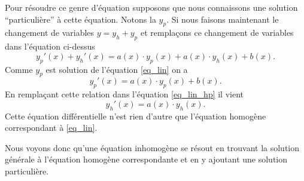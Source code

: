 \documentclass[a4paper,12pt]{book}
\renewcommand{\eqref}[1]{\ref{#1}}
\begin{document}
Pour résoudre ce genre d'équation supposons que nous connaissons une solution ``particulière'' à cette équation. Notons la
$y_p$. Si nous faisons maintenant le changement de variables $y=y_h+y_p$ et remplaçons
ce changement de variables dans l'équation ci-dessus
\begin{equation}
 y_p'(x)+y_h'(x)=a(x)\cdot y_p(x)+a(x)\cdot y_h(x)+b(x).\label{eq_lin_hp}
 \end{equation}
Comme $y_p$ est solution de l'équation \eqref{eq_lin} on a 
\begin{equation}
 y_p'(x)=a(x)\cdot y_p(x)+b(x).
\end{equation}
En remplaçant cette relation dans l'équation \eqref{eq_lin_hp} il vient 
\begin{equation}
 y_h'(x)=a(x)\cdot y_h(x).
\end{equation}
Cette équation différentielle n'est rien d'autre que l'équation homogène correspondant à \eqref{eq_lin}.

Nous voyons donc qu'une équation inhomogène se résout en trouvant la solution générale à l'équation homogène
correspondante et en y ajoutant une solution particulière.
 
\end{document}

